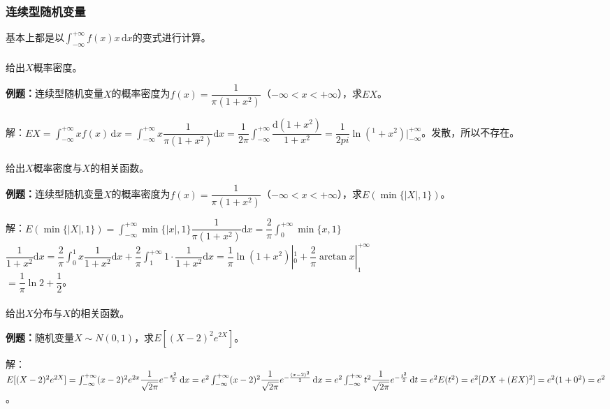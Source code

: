 \subsubsection{连续型随机变量}

基本上都是以$\int_{-\infty}^{+\infty}f(x)x\,\textrm{d}x$的变式进行计算。

\paragraph{} \leavevmode \medskip

给出$X$概率密度。

\textbf{例题：}连续型随机变量$X$的概率密度为$f(x)=\dfrac{1}{\pi(1+x^2)}$（$-\infty<x<+\infty$），求$EX$。

解：$EX=\int_{-\infty}^{+\infty}xf(x)\,\textrm{d}x=\int_{-\infty}^{+\infty}x\dfrac{1}{\pi(1+x^2)}\textrm{d}x=\dfrac{1}{2\pi}\int_{-\infty}^{+\infty}\dfrac{\textrm{d}(1+x^2)}{1+x^2}=\dfrac{1}{2pi}\ln(^1+x^2)|_{-\infty}^{+\infty}$。发散，所以不存在。

\paragraph{} \leavevmode \medskip

给出$X$概率密度与$X$的相关函数。

\textbf{例题：}连续型随机变量$X$的概率密度为$f(x)=\dfrac{1}{\pi(1+x^2)}$（$-\infty<x<+\infty$），求$E(\min\{\vert X\vert,1\})$。

解：$E(\min\{\vert X\vert,1\})=\displaystyle{\int_{-\infty}^{+\infty}}\min\{\vert x\vert,1\}\dfrac{1}{\pi(1+x^2)}\textrm{d}x=\dfrac{2}{\pi}\int_0^{+\infty}\min\{x,1\}$\\$\dfrac{1}{1+x^2}\textrm{d}x=\dfrac{2}{\pi}\displaystyle{\int_0^1}x\dfrac{1}{1+x^2}\textrm{d}x+\dfrac{2}{\pi}\int_1^{+\infty}1\cdot\dfrac{1}{1+x^2}\textrm{d}x=\dfrac{1}{\pi}\ln(1+x^2)|_0^1+\dfrac{2}{\pi}\arctan x|_1^{+\infty}$\\$=\dfrac{1}{\pi}\ln2+\dfrac{1}{2}$。

\paragraph{} \leavevmode \medskip

给出$X$分布与$X$的相关函数。

\textbf{例题：}随机变量$X\sim N(0,1)$，求$E[(X-2)^2e^{2X}]$。

解：$E[(X-2)^2e^{2X}]=\int_{-\infty}^{+\infty}(x-2)^2e^{2x}\dfrac{1}{\sqrt{2\pi}}e^{-\frac{x^2}{2}}\,\textrm{d}x\\=e^2\int_{-\infty}^{+\infty}(x-2)^2\dfrac{1}{\sqrt{2\pi}}e^{-\frac{(x-2)^2}{2}}\,\textrm{d}x=e^2\int_{-\infty}^{+\infty}t^2\dfrac{1}{\sqrt{2\pi}}e^{-\frac{t^2}{2}}\,\textrm{d}t=e^2E(t^2)=e^2[DX+(EX)^2]=e^2(1+0^2)=e^2$。

